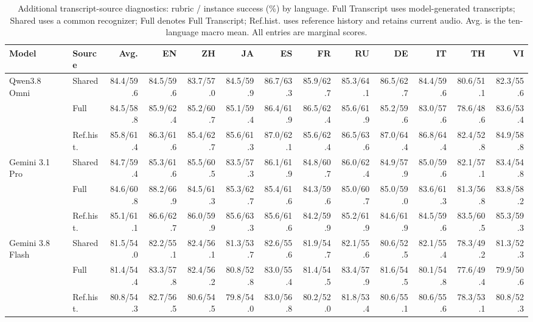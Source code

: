 \begin{table}[htbp]
\centering
\caption{Additional transcript-source diagnostics: rubric / instance success (\%) by language. Full Transcript uses model-generated transcripts; Shared uses a common recognizer; Full denotes Full Transcript; Ref.hist. uses reference history and retains current audio. Avg. is the ten-language macro mean. All entries are marginal scores.}
\label{tab:source_conditions}
\begingroup
\fontsize{7.0}{9.0}\selectfont
\setlength{\tabcolsep}{1pt}
\renewcommand{\arraystretch}{1.06}
\begin{tabular*}{\linewidth}{@{}ll@{\extracolsep{\fill}}*{11}{r}@{}}
\toprule
\textbf{Model} & \textbf{Source} & \textbf{Avg.} & \textbf{EN} & \textbf{ZH} & \textbf{JA} & \textbf{ES} & \textbf{FR} & \textbf{RU} & \textbf{DE} & \textbf{IT} & \textbf{TH} & \textbf{VI} \\
\midrule
Qwen3.8 Omni & Shared & 84.4/59.6 & 84.5/59.6 & 83.7/57.0 & 84.5/59.9 & 86.7/63.3 & 85.9/62.7 & 85.3/64.1 & 86.5/62.7 & 84.4/59.6 & 80.6/51.1 & 82.3/55.6 \\
 & Full & 84.5/58.8 & 85.9/62.4 & 85.2/60.7 & 85.1/59.4 & 86.4/61.9 & 86.5/62.4 & 85.6/61.9 & 85.2/59.6 & 83.0/57.6 & 78.6/48.6 & 83.6/53.4 \\
 & Ref.hist. & 85.8/61.4 & 86.3/61.6 & 85.4/62.7 & 85.6/61.3 & 87.0/62.1 & 85.6/62.4 & 86.5/63.6 & 87.0/64.4 & 86.8/64.4 & 82.4/52.8 & 84.9/58.8 \\
\addlinespace[2pt]
Gemini 3.1 Pro & Shared & 84.7/59.4 & 85.3/61.6 & 85.5/60.5 & 83.5/57.3 & 86.1/61.9 & 84.8/60.7 & 86.0/62.4 & 84.9/57.9 & 85.0/59.6 & 82.1/57.1 & 83.4/54.8 \\
 & Full & 84.6/60.8 & 88.2/66.9 & 84.5/61.3 & 85.3/62.7 & 85.4/61.6 & 84.3/59.6 & 85.0/60.7 & 85.0/59.0 & 83.6/61.3 & 81.3/56.8 & 83.8/58.2 \\
 & Ref.hist. & 85.1/61.1 & 86.6/62.7 & 86.0/59.9 & 85.6/63.3 & 85.6/61.6 & 84.2/59.9 & 85.2/61.9 & 84.6/61.9 & 84.5/59.6 & 83.5/60.5 & 85.3/59.3 \\
\addlinespace[2pt]
Gemini 3.8 Flash & Shared & 81.5/54.0 & 82.2/55.1 & 82.4/56.1 & 81.3/53.7 & 82.6/55.6 & 81.9/54.7 & 82.1/55.6 & 80.6/52.5 & 82.1/55.4 & 78.3/49.2 & 81.3/52.3 \\
 & Full & 81.4/54.4 & 83.3/57.8 & 82.4/56.2 & 80.8/52.8 & 83.0/55.4 & 81.4/54.5 & 83.4/57.9 & 81.6/54.5 & 80.1/54.8 & 77.6/49.4 & 79.9/50.6 \\
 & Ref.hist. & 80.8/54.3 & 82.7/56.5 & 80.6/54.5 & 79.8/54.0 & 83.0/56.8 & 80.2/52.0 & 81.8/53.4 & 80.6/55.1 & 80.6/55.6 & 78.3/53.1 & 80.8/52.3 \\

\end{tabular*}
\end{table}
